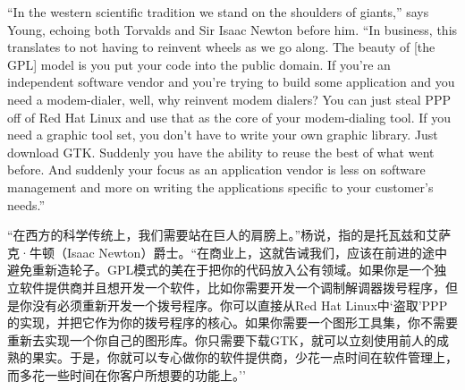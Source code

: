 \ifdefined\eng
``In the western scientific tradition we stand on the shoulders of giants,'' says Young, echoing both Torvalds and Sir Isaac Newton before him. ``In business, this translates to not having to reinvent wheels as we go along. The beauty of [the GPL] model is you put your code into the public domain. If you're an independent software vendor and you're trying to build some application and you need a modem-dialer, well, why reinvent modem dialers? You can just steal PPP off of Red Hat Linux and use that as the core of your modem-dialing tool. If you need a graphic tool set, you don't have to write your own graphic library. Just download GTK. Suddenly you have the ability to reuse the best of what went before. And suddenly your focus as an application vendor is less on software management and more on writing the applications specific to your customer's needs.''
\fi

\ifdefined\chs
``在西方的科学传统上，我们需要站在巨人的肩膀上。''杨说，指的是托瓦兹和艾萨克·牛顿（Isaac Newton）爵士。``在商业上，这就告诫我们，应该在前进的途中避免重新造轮子。GPL模式的美在于把你的代码放入公有领域。如果你是一个独立软件提供商并且想开发一个软件，比如你需要开发一个调制解调器拨号程序，但是你没有必须重新开发一个拨号程序。你可以直接从Red Hat Linux中`盗取'PPP的实现，并把它作为你的拨号程序的核心。如果你需要一个图形工具集，你不需要重新去实现一个你自己的图形库。你只需要下载GTK，就可以立刻使用前人的成熟的果实。于是，你就可以专心做你的软件提供商，少花一点时间在软件管理上，而多花一些时间在你客户所想要的功能上。''
\fi

